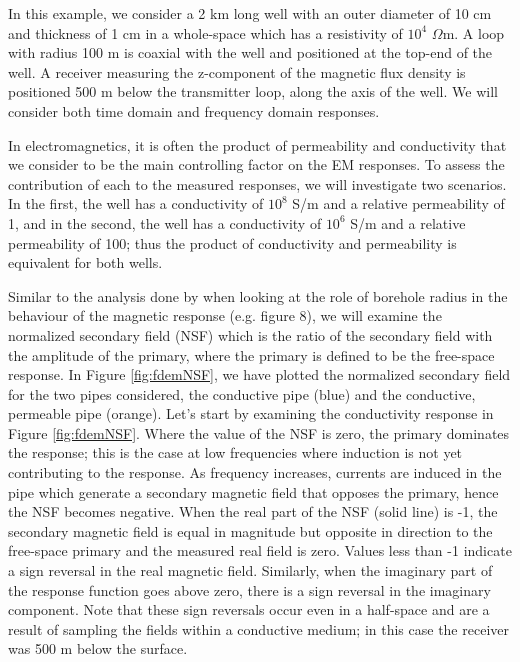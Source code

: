 In this example, we consider a 2 km long well with an outer diameter of 10 cm and thickness of 1 cm in a whole-space which has a resistivity of $10^4$ $\Omega$m. A loop with radius 100 m is coaxial with the well and positioned at the top-end of the well. A receiver measuring the z-component of the magnetic flux density is positioned 500 m below the transmitter loop, along the axis of the well. We will consider both time domain and frequency domain responses.

In electromagnetics, it is often the product of permeability and conductivity that we consider to be the main controlling factor on the EM responses. To assess the contribution of each to the measured responses, we will investigate two scenarios. In the first, the well has a conductivity of $10^8$ S/m and a relative permeability of 1, and in the second, the well has a conductivity of $10^6$ S/m and a relative permeability of 100; thus the product of conductivity and permeability is equivalent for both wells.

Similar to the analysis done by \cite{Augustin1989} when looking at the role of borehole radius in the behaviour of the magnetic response (e.g. figure 8), we will examine the normalized secondary field (NSF) which is the ratio of the secondary field with the amplitude of the primary, where the primary is defined to be the free-space response. In Figure \ref{fig:fdemNSF}, we have plotted the normalized secondary field for the two pipes considered, the conductive pipe (blue) and the conductive, permeable pipe (orange). Let's start by examining the conductivity response in Figure \ref{fig:fdemNSF}. Where the value of the NSF is zero, the primary dominates the response; this is the case at low frequencies where induction is not yet contributing to the response. As frequency increases, currents are induced in the pipe which generate a secondary magnetic field that opposes the primary, hence the NSF becomes negative. When the real part of the NSF (solid line) is -1, the secondary magnetic field is equal in magnitude but opposite in direction to the free-space primary and the measured real field is zero. Values less than -1 indicate a sign reversal in the real magnetic field. Similarly, when the imaginary part of the response function goes above zero, there is a sign reversal in the imaginary component. Note that these sign reversals occur even in a half-space and are a result of sampling the fields within a conductive medium; in this case the receiver was 500 m below the surface.


